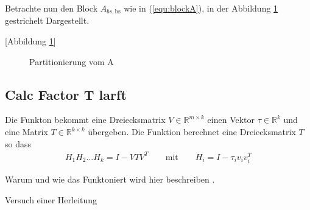 Betrachte nun den Block $A_{bs, \text{bs}}$ wie in (\ref{equ:blockA}), in der Abbildung \ref{fig:blockA} gestrichelt Dargestellt.

[Abbildung \ref{fig:blockA}]
\begin{figure}
	\centering
	
	\caption{Partitionierung vom A}
	\label{fig:blockA}
\end{figure}

\subsection{Calc Factor T larft}

Die Funkton bekommt eine Dreiecksmatrix $V \in \mathbb{R}^{m \times k}$ einen Vektor $\tau \in \mathbb{R}^k$ und eine Matrix $T\in \mathbb{R}^{k\times k}$ übergeben. 
Die Funktion berechnet eine Dreiecksmatrix $T$ so dass
\begin{align*}
	H_1H_2...H_k = I - VTV^T \qquad \text{mit}\qquad H_i = I - \tau_i v_iv_i^T
\end{align*}

Warum und wie das Funktoniert wird hier beschreiben \cite{Joffrain:2006:AHT:1141885.1141886}.

Versuch einer Herleitung


